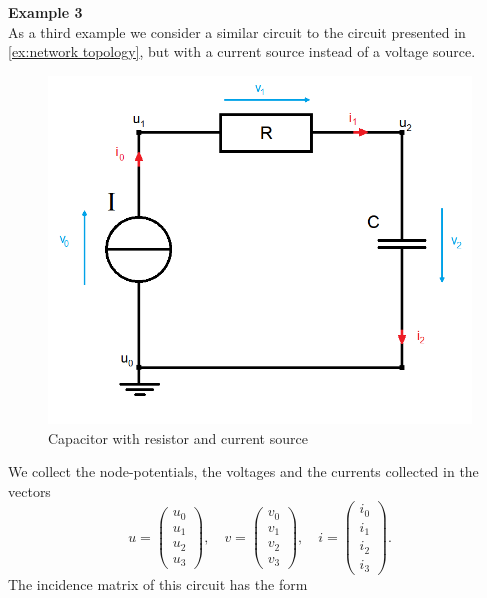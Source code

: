 \textbf{Example 3} \label{ex:Example 3 - incidence matrix } \\
As a third example we consider a similar circuit to the circuit presented in \ref{ex:network topology}, but with a current source instead of a voltage source.
\begin{figure}[H]
	\label{circuit:Example 3}
	\centering
	\includegraphics[scale=0.5]{pictures/Example3.png}
	\caption{Capacitor with resistor and current source}
\end{figure}

We collect the node-potentials, the voltages and the currents collected in the vectors
\begin{displaymath}
	u=
	\left(
	\begin{matrix}
		u_0 \\
		u_1 \\
		u_2 \\
		u_3 
	\end{matrix}
	\right),
	\quad
	v=
	\left(
	\begin{matrix}
		v_0 \\
		v_1 \\
		v_2 \\
		v_3 
	\end{matrix}
	\right),
	\quad
	i=
	\left(
	\begin{matrix}
		i_0 \\
		i_1 \\
		i_2 \\
		i_3 
	\end{matrix}
	\right).
\end{displaymath}
The incidence matrix of this circuit has the form

